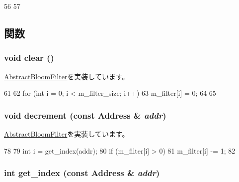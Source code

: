\begin{DoxyCode}
56 {
57 }
\end{DoxyCode}


\subsection{関数}
\hypertarget{classLSB__CountingBloomFilter_ac8bb3912a3ce86b15842e79d0b421204}{
\subsubsection[{clear}]{\setlength{\rightskip}{0pt plus 5cm}void clear ()}}
\label{classLSB__CountingBloomFilter_ac8bb3912a3ce86b15842e79d0b421204}


\hyperlink{classAbstractBloomFilter_a5eeb94d22b8366d1b68d0614384802fe}{AbstractBloomFilter}を実装しています。


\begin{DoxyCode}
61 {
62     for (int i = 0; i < m_filter_size; i++) {
63         m_filter[i] = 0;
64     }
65 }
\end{DoxyCode}
\hypertarget{classLSB__CountingBloomFilter_addb6b805abb8328082a24926f2bf8c84}{
\subsubsection[{decrement}]{\setlength{\rightskip}{0pt plus 5cm}void decrement (const {\bf Address} \& {\em addr})}}
\label{classLSB__CountingBloomFilter_addb6b805abb8328082a24926f2bf8c84}


\hyperlink{classAbstractBloomFilter_aa387151f4ab03c6cd497d4385e34c21a}{AbstractBloomFilter}を実装しています。


\begin{DoxyCode}
78 {
79     int i = get_index(addr);
80     if (m_filter[i] > 0)
81         m_filter[i] -= 1;
82 }
\end{DoxyCode}
\hypertarget{classLSB__CountingBloomFilter_a0a9fd2f2f75033080fc27830f7c0fe64}{
\subsubsection[{get\_\-index}]{\setlength{\rightskip}{0pt plus 5cm}int get\_\-index (const {\bf Address} \& {\em addr})}}
\label{classLSB__CountingBloomFilter_a0a9fd2f2f75033080fc27830f7c0fe64}



